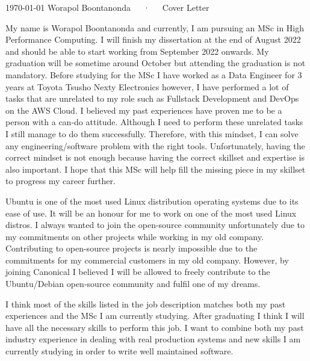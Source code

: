 \documentclass[11pt, a4paper]{awesome-cv}
\begin{document}
\makecvheader[R]

\makecvfooter
  {\today}
  {Worapol Boontanonda~~~·~~~Cover Letter}
  {}

\makelettertitle

\begin{cvletter}

My name is Worapol Boontanonda and currently, I am pursuing an MSc in High Performance Computing.
I will finish my dissertation at the end of August 2022 and should be able to start working from
September 2022 onwards. My graduation will be sometime around October but attending the graduation is not mandatory.
Before studying for the MSc I have worked as a Data Engineer for 3 years at Toyota Tsusho Nexty Electronics 
however, I have performed a lot of tasks that are unrelated to my role such as Fullstack Development 
and DevOps on the AWS Cloud. I believed my past experiences have proven me to be a person 
with a can-do attitude. Although I need to perform these unrelated tasks I still manage to do them successfully. 
Therefore, with this mindset, I can solve any engineering/software problem with the right tools. 
Unfortunately, having the correct mindset is not enough 
because having the correct skillset and expertise is also important. 
I hope that this MSc will help fill the missing piece in my skillset to progress my career further.

Ubuntu is one of the most used Linux distribution operating systems due to its ease of use. It will be an honour for me to work
on one of the most used Linux distros. I always wanted to join the open-source community unfortunately due to my
commitments on other projects while working in my old company. 
Contributing to open-source projects is nearly impossible due to the commitments for my commercial customers in my
old company. However, by joining Canonical I believed I will be allowed to freely contribute to the Ubuntu/Debian open-source community
and fulfil one of my dreams.

I think most of the skills listed in the job description matches both my past experiences and the MSc I am currently
studying. After graduating I think I will have all the necessary skills to perform this job. I want to combine
both my past industry experience in dealing with real production systems and new skills I am currently studying
in order to write well maintained software.

\end{cvletter}


\makeletterclosing
\end{document}
